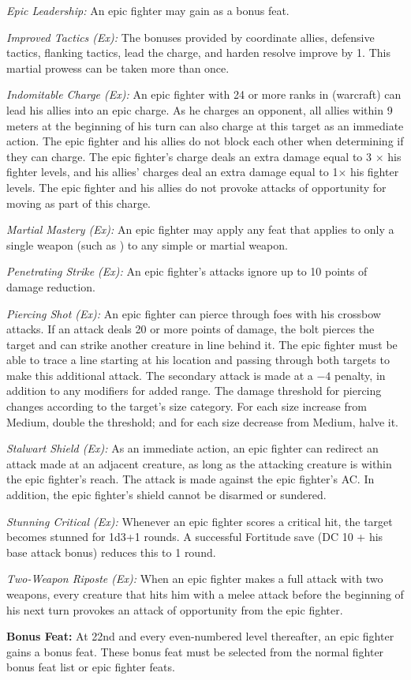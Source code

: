 \textit{Epic Leadership:} An epic fighter may gain  as a bonus feat.

\textit{Improved Tactics (Ex):} The bonuses provided by coordinate allies, defensive tactics, flanking tactics, lead the charge, and harden resolve improve by 1. This martial prowess can be taken more than once.

\textit{Indomitable Charge (Ex):} An epic fighter with 24 or more ranks in  (warcraft) can lead his allies into an epic charge. As he charges an opponent, all allies within 9 meters at the beginning of his turn can also charge at this target as an immediate action. The epic fighter and his allies do not block each other when determining if they can charge. The epic fighter's charge deals an extra damage equal to 3 $\times$ his fighter levels, and his allies' charges deal an extra damage equal to 1\onehalf $\times$ his fighter levels. The epic fighter and his allies do not provoke attacks of opportunity for moving as part of this charge.

\textit{Martial Mastery (Ex):} An epic fighter may apply any feat that applies to only a single weapon (such as ) to any simple or martial weapon.

\textit{Penetrating Strike (Ex):} An epic fighter's attacks ignore up to 10 points of damage reduction.

\textit{Piercing Shot (Ex):} An epic fighter can pierce through foes with his crossbow attacks. If an attack deals 20 or more points of damage, the bolt pierces the target and can strike another creature in line behind it. The epic fighter must be able to trace a line starting at his location and passing through both targets to make this additional attack. The secondary attack is made at a $-4$ penalty, in addition to any modifiers for added range. The damage threshold for piercing changes according to the target's size category. For each size increase from Medium, double the threshold; and for each size decrease from Medium, halve it.

\textit{Stalwart Shield (Ex):} As an immediate action, an epic fighter can redirect an attack made at an adjacent creature, as long as the attacking creature is within the epic fighter's reach. The attack is made against the epic fighter's AC. In addition, the epic fighter's shield cannot be disarmed or sundered.

\textit{Stunning Critical (Ex):} Whenever an epic fighter scores a critical hit, the target becomes stunned for 1d3+1 rounds. A successful Fortitude save (DC 10 + his base attack bonus) reduces this to 1 round.

\textit{Two-Weapon Riposte (Ex):} When an epic fighter makes a full attack with two weapons, every creature that hits him with a melee attack before the beginning of his next turn provokes an attack of opportunity from the epic fighter.

\textbf{Bonus Feat:} At 22nd and every even-numbered level thereafter, an epic fighter gains a bonus feat. These bonus feat must be selected from the normal fighter bonus feat list or epic fighter feats.
